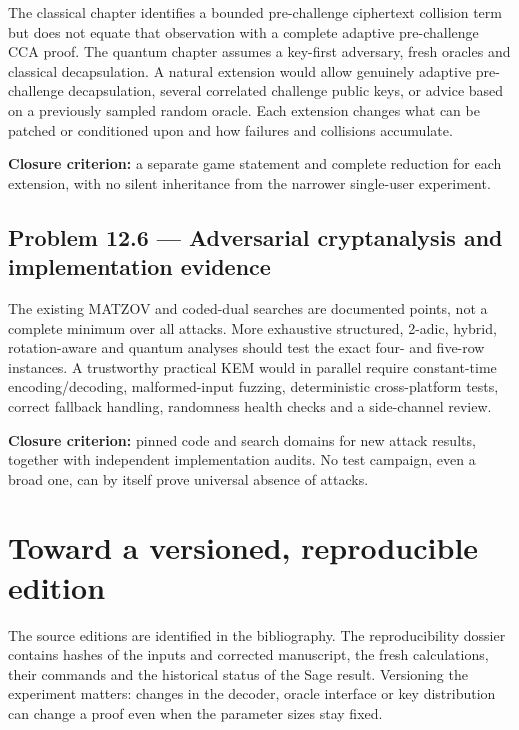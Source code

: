 \documentclass[
  11pt,
  a4paper,
  oneside]{report}
\begin{document}
The classical chapter identifies a bounded pre-challenge ciphertext
collision term but does not equate that observation with a complete
adaptive pre-challenge CCA proof. The quantum chapter assumes a
key-first adversary, fresh oracles and classical decapsulation. A
natural extension would allow genuinely adaptive pre-challenge
decapsulation, several correlated challenge public keys, or advice based
on a previously sampled random oracle. Each extension changes what can
be patched or conditioned upon and how failures and collisions
accumulate.

\textbf{Closure criterion:} a separate game statement and complete
reduction for each extension, with no silent inheritance from the
narrower single-user experiment.

\subsection{Problem 12.6 --- Adversarial cryptanalysis and
implementation
evidence}\label{problem-12.6-adversarial-cryptanalysis-and-implementation-evidence}

The existing MATZOV and coded-dual searches are documented points, not a
complete minimum over all attacks. More exhaustive structured, 2-adic,
hybrid, rotation-aware and quantum analyses should test the exact four-
and five-row instances. A trustworthy practical KEM would in parallel
require constant-time encoding/decoding, malformed-input fuzzing,
deterministic cross-platform tests, correct fallback handling,
randomness health checks and a side-channel review.

\textbf{Closure criterion:} pinned code and search domains for new
attack results, together with independent implementation audits. No test
campaign, even a broad one, can by itself prove universal absence of
attacks.

\section{Toward a versioned, reproducible
edition}\label{toward-a-versioned-reproducible-edition}

The source editions are identified in the bibliography. The
reproducibility dossier contains hashes of the inputs and corrected
manuscript, the fresh calculations, their commands and the historical
status of the Sage result. Versioning the experiment matters: changes in
the decoder, oracle interface or key distribution can change a proof
even when the parameter sizes stay fixed.
\end{document}
